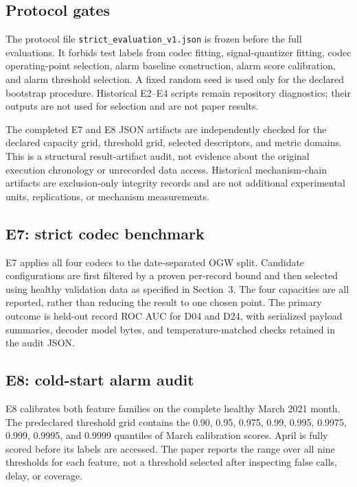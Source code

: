 \subsection{Protocol gates}
The protocol file \texttt{strict\_evaluation\_v1.json} is frozen before the
full evaluations. It forbids test labels from codec fitting, signal-quantizer
fitting, codec operating-point selection, alarm baseline construction, alarm
score calibration, and alarm threshold selection. A fixed random seed is
used only for the declared bootstrap procedure. Historical E2--E4 scripts
remain repository diagnostics; their outputs are not used for selection and
are not paper results.

The completed E7 and E8 JSON artifacts are independently checked for the
declared capacity grid, threshold grid, selected descriptors, and metric
domains. This is a structural result-artifact audit, not evidence about the
original execution chronology or unrecorded data access. Historical
mechanism-chain artifacts are exclusion-only integrity records and are not
additional experimental units, replications, or mechanism measurements.

\subsection{E7: strict codec benchmark}
E7 applies all four codecs to the date-separated OGW split. Candidate
configurations are first filtered by a proven per-record bound and then
selected using healthy validation data as specified in Section~3. The four
capacities are all reported, rather than reducing the result to one chosen
point. The primary outcome is held-out record ROC AUC for D04 and D24, with
serialized payload summaries, decoder model bytes, and temperature-matched
checks retained in the audit JSON.

\subsection{E8: cold-start alarm audit}
E8 calibrates both feature families on the complete healthy March 2021
month. The predeclared threshold grid contains the 0.90, 0.95, 0.975, 0.99,
0.995, 0.9975, 0.999, 0.9995, and 0.9999 quantiles of March calibration
scores. April is fully scored before its labels are accessed. The paper
reports the range over all nine thresholds for each feature, not a threshold
selected after inspecting false calls, delay, or coverage.
